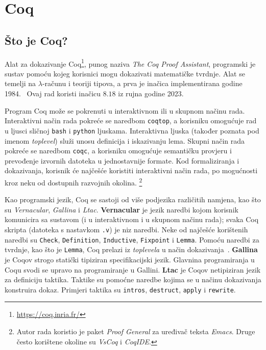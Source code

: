 \chapter{Coq}\label{pog:glavni_dio}

\section{Što je Coq?}\label{sec:osnovno-o-coqu}

Alat za dokazivanje Coq\footnote{\url{https://coq.inria.fr/}}, punog naziva \textit{The Coq Proof Assistant},
programski je sustav pomoću kojeg korisnici mogu dokazivati matematičke tvrdnje. 
Alat se temelji na \(\lambda\)-računu i teoriji tipova, a prva je inačica implementirana godine 1984.~\cite{coqrefman}
Ovaj rad koristi inačicu \(8.18\) iz rujna godine 2023.

Program Coq može se pokrenuti u interaktivnom ili u skupnom načinu rada.
Interaktivni način rada pokreće se naredbom \texttt{coqtop}, a korisniku omogućuje rad u ljusci sličnoj \texttt{bash} i \texttt{python} ljuskama.
Interaktivna ljuska (također poznata pod imenom \textit{toplevel}) služi unosu definicija i iskazivanju lema.
Skupni način rada pokreće se naredbom \texttt{coqc}, a korisniku omogućuje semantičku provjeru i prevođenje izvornih datoteka u jednostavnije formate.
Kod formaliziranja i dokazivanja, korisnik će najčešće koristiti interaktivni način rada, po mogućnosti kroz neku od dostupnih razvojnih okolina.
\footnote{Autor rada koristio je paket \textit{Proof General} za uređivač teksta \textit{Emacs}. Druge često korištene okoline su \textit{VsCoq} i \textit{CoqIDE}.}


Kao programski jezik, Coq se sastoji od više podjezika različitih namjena, kao što su \textit{Vernacular}, \textit{Gallina} i \textit{Ltac}.
\textbf{Vernacular} je jezik naredbi kojom korisnik komunicira sa sustavom (i u interaktivnom i u skupnom načinu rada);
svaka Coq skripta (datoteka s nastavkom \texttt{.v}) je niz naredbi.
Neke od najčešće korištenih naredbi su \texttt{Check}, \texttt{Definition}, \texttt{Inductive}, \texttt{Fixpoint} i \texttt{Lemma}.
Pomoću naredbi za tvrdnje, kao što je \texttt{Lemma}, Coq prelazi iz \textit{toplevela} u način dokazivanja~.
\textbf{Gallina} je Coqov strogo statički tipiziran specifikacijski jezik. Glavnina programiranja u Coqu svodi se upravo na programiranje u Gallini.
\textbf{Ltac} je Coqov netipiziran jezik za definiciju taktika. Taktike su pomoćne naredbe kojima se u načinu dokazivanja konstruira dokaz.
Primjeri taktika su \texttt{intros}, \texttt{destruct}, \texttt{apply} i \texttt{rewrite}.



